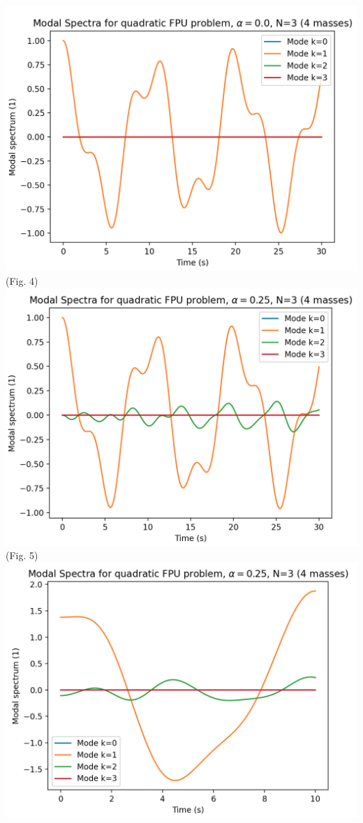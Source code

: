 \documentclass{article}
\begin{document}
\begin{center}
    \includegraphics[scale=.5]{modea0k1.png}\\ 
    (Fig. 4)\\ 
    \includegraphics[scale=.5]{modea25k1.png}\\ 
    (Fig. 5)\\ 
    \includegraphics[scale=.5]{modea25arb.png}\\ 

\end{center}
\end{document}
